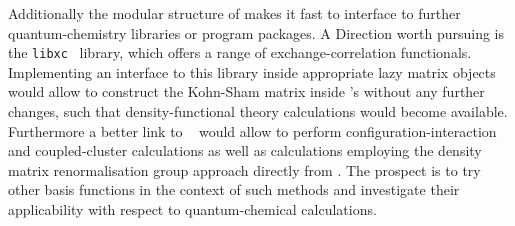 Additionally the modular structure of \molsturm
makes it fast to interface to
further quantum-chemistry libraries or program packages.
A Direction worth pursuing is the \texttt{libxc}~\cite{Lehtola2018} library,
which offers a range of exchange-correlation functionals.
Implementing an interface to this library inside appropriate
lazy matrix objects would allow to construct the Kohn-Sham matrix
inside \molsturm's \SCF without any further changes,
such that density-functional theory calculations would become available.
Furthermore a better link to \pyscf~\cite{Sun2017}
would allow to perform configuration-interaction
and coupled-cluster calculations as well as calculations
employing the density matrix renormalisation group approach
directly from \molsturm.
The prospect is to try other basis functions
in the context of such methods
and investigate their applicability with respect to quantum-chemical
calculations.



